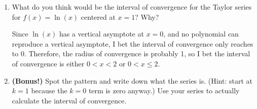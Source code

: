 \begin{enumerate}[leftmargin=0pt]
\begin{enumerate}
\begin{red}
    So, to be sure we have the first two decimal places correct, we want the result of the Lagrange error bound to be less than $0.001$:
    \begin{align*}
        \frac{M\ |c-a|^{n+1}}{(n+1)!} &< 0.001 = \frac{1}{1000} \\
        \frac{n!\ |2-1|^{n+1}}{(n+1)!} &< \frac{1}{1000} \\
        \frac{1}{n+1} &< \frac{1}{1000}
    \end{align*}
    Wow, so we need $n+1 > 1000$! Therefore we need to go out to the 1000th Taylor polynomial to even be sure that we're accurate to within two decimal places!
    
    (Okay, I guess if we think about this a little more, we just need to be accurate to within 0.005, because of how rounding works, and that'll give us something more like $n=200$, but still, dang!)
    
    Conclusions: the Taylor series for $\ln(x)$ converges exceptionally slowly; probably there has to be some kind of better way to produce rational approximations to values of the natural logarithm.
    \end{red}
    \item What do you think would be the interval of convergence for the Taylor series for $f(x) = \ln(x)$ centered at $x=1$? Why?
    
    \begin{red}
    Since $\ln(x)$ has a vertical asymptote at $x=0$, and no polynomial can reproduce a vertical asymptote, I bet the interval of convergence only reaches to 0. Therefore, the radius of convergence is probably 1, so I bet the interval of convergence is either $0 < x < 2$ or $0 < x \leq 2$.
    \end{red}
    \item \textbf{(Bonus!)} Spot the pattern and write down what the series is. (Hint: start at $k=1$ because the $k=0$ term is zero anyway.) Use your series to actually calculate the interval of convergence.
    

\end{enumerate}
\end{enumerate}
